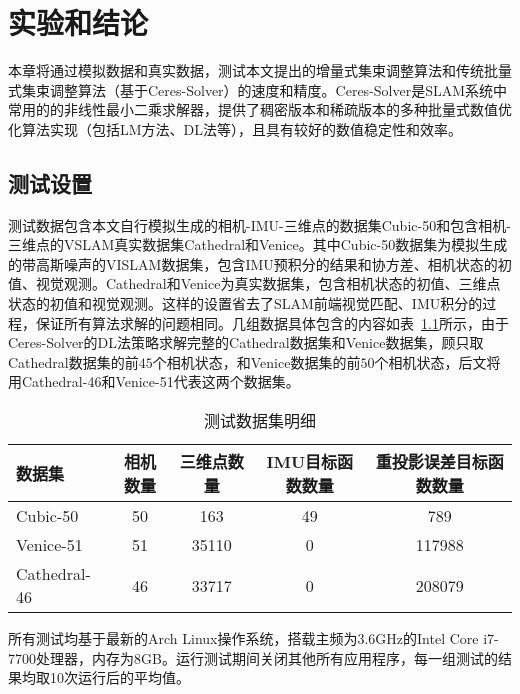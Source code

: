 \chapter{实验和结论}\label{ch:exp}

本章将通过模拟数据和真实数据，测试本文提出的增量式集束调整算法和传统批量式集束调整算法（基于Ceres-Solver）的速度和精度。Ceres-Solver是SLAM系统中常用的的非线性最小二乘求解器，提供了稠密版本和稀疏版本的多种批量式数值优化算法实现（包括LM方法、DL法等），且具有较好的数值稳定性和效率。

\section{测试设置}

测试数据包含本文自行模拟生成的相机-IMU-三维点的数据集Cubic-50和包含相机-三维点的VSLAM真实数据集Cathedral\citep{kim2014influence}和Venice\citep{kummerle2011g}。其中Cubic-50数据集为模拟生成的带高斯噪声的VISLAM数据集，包含IMU预积分的结果和协方差、相机状态的初值、视觉观测。Cathedral和Venice为真实数据集，包含相机状态的初值、三维点状态的初值和视觉观测。这样的设置省去了SLAM前端视觉匹配、IMU积分的过程，保证所有算法求解的问题相同。几组数据具体包含的内容如表~\ref{tab:dataset}所示，由于Ceres-Solver的DL法策略求解完整的Cathedral数据集和Venice数据集，顾只取Cathedral数据集的前$45$个相机状态，和Venice数据集的前$50$个相机状态，后文将用Cathedral-46和Venice-51代表这两个数据集。

{
\linespread{1}
\begin{table}[htb!]
\caption{测试数据集明细}
\label{tab:dataset}
\centering
\begin{tabular}{l|cccc}
    \toprule
    数据集       & 相机数量 & 三维点数量 & IMU目标函数数量 & 重投影误差目标函数数量 \\ \midrule
    Cubic-50     &       50 &        163 &              49 &                    789 \\
    Venice-51    &       51 &      35110 &               0 &                 117988 \\
    Cathedral-46 &       46 &      33717 &               0 &                 208079 \\
    \bottomrule
\end{tabular}
\end{table}
}

所有测试均基于最新的Arch Linux操作系统，搭载主频为3.6GHz的Intel Core i7-7700处理器，内存为8GB。运行测试期间关闭其他所有应用程序，每一组测试的结果均取10次运行后的平均值。

